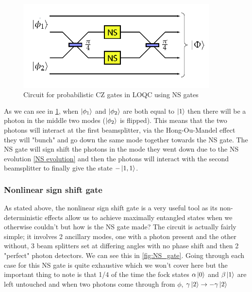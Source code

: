 \begin{figure}[h]
    \centering
    \includegraphics[width=0.9\textwidth]{images/CZ-gate.png}
    \caption{Circuit for probabilistic CZ gates in LOQC using NS gates}\label{fig:CZ_gate}
\end{figure}

As we can see in \ref{fig:CZ_gate}, when $\ket{\phi_1}$ and $\ket{\phi_2}$ are both equal to $\ket{1}$ then there will be a photon in the middle two modes ($\ket{\phi_2}$ is flipped). This means that the two photons will interact at the first beamsplitter, via the Hong-Ou-Mandel effect they will "bunch" and go down the same mode together towards the NS gate. The NS gate will sign shift the photons in the mode they went down due to the NS evolution \ref{NS evolution} and then the photons will interact with the second beamsplitter to finally give the state $-\ket{1,1}$.%

\subsubsection{Nonlinear sign shift gate}
As stated above, the nonlinear sign shift gate is a very useful tool as its non-deterministic effects allow us to achieve maximally entangled states when we otherwise couldn't but how is the NS gate made? The circuit is actually fairly simple; it involves 2 ancillary modes, one with a photon present and the other without, 3 beam splitters set at differing angles with no phase shift and then 2 "perfect" photon detectors. We can see this in \ref{fig:NS_gate}. Going through each case for this NS gate is quite exhaustive which we won't cover here but the important thing to note is that 1/4 of the time the fock states $\alpha\ket{0}$ and $\beta\ket{1}$ are left untouched and when two photons come through from $\phi$, $\gamma\ket{2} \rightarrow -\gamma\ket{2}$ 

